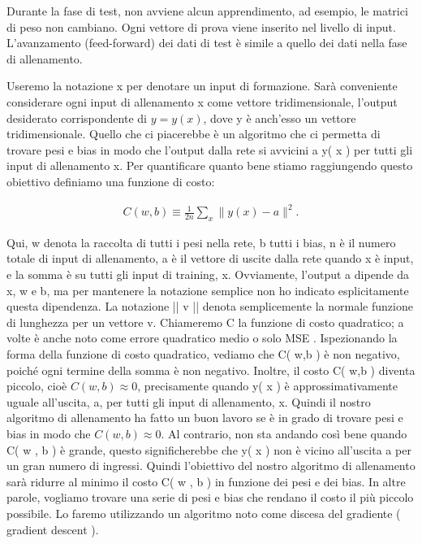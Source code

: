 Durante la fase di test, non avviene alcun apprendimento, ad esempio, le matrici di peso non cambiano. Ogni vettore di prova viene inserito nel livello di input. L'avanzamento (feed-forward) dei dati di test è simile a quello dei dati nella fase di allenamento.

Useremo la notazione x per denotare un input di formazione. Sarà conveniente considerare ogni input di allenamento x come vettore tridimensionale, l'output desiderato corrispondente di $y = y( x )$, dove y è anch'esso un vettore tridimensionale.
Quello che ci piacerebbe è un algoritmo che ci permetta di trovare pesi e bias in modo che l'output dalla rete si avvicini a y( x ) per tutti gli input di allenamento x. Per quantificare quanto bene stiamo raggiungendo questo obiettivo definiamo una funzione di costo:

\begin{eqnarray}  C(w,b) \equiv
  \frac{1}{2n} \sum_x \| y(x) - a\|^2.
\end{eqnarray}

Qui, w denota la raccolta di tutti i pesi nella rete, b tutti i bias, n è il numero totale di input di allenamento, a è il vettore di uscite dalla rete quando x è input, e la somma è su tutti gli input di training, x.
Ovviamente, l'output a dipende da x, w e b, ma per mantenere la notazione semplice non ho indicato esplicitamente questa dipendenza. La notazione || v || denota semplicemente la normale funzione di lunghezza per un vettore v. Chiameremo C la funzione di costo quadratico; a volte è anche noto come errore quadratico medio o solo MSE . 
Ispezionando la forma della funzione di costo quadratico, vediamo che C( w,b ) è non negativo, poiché ogni termine della somma è non negativo. Inoltre, il costo C( w,b ) diventa piccolo, cioè $C( w,b ) \approx 0$, precisamente quando y( x ) è approssimativamente uguale all'uscita, a, per tutti gli input di allenamento, x. Quindi il nostro algoritmo di allenamento ha fatto un buon lavoro se è in grado di trovare pesi e bias in modo che $C( w , b ) \approx 0$. Al contrario, non sta andando così bene quando C( w , b ) è grande, questo significherebbe che y( x ) non è vicino all'uscita a per un gran numero di ingressi. Quindi l'obiettivo del nostro algoritmo di allenamento sarà ridurre al minimo il costo C( w , b ) in funzione dei pesi e dei bias. In altre parole, vogliamo trovare una serie di pesi e bias che rendano il costo il più piccolo possibile. Lo faremo utilizzando un algoritmo noto come discesa del gradiente ( gradient descent ).

